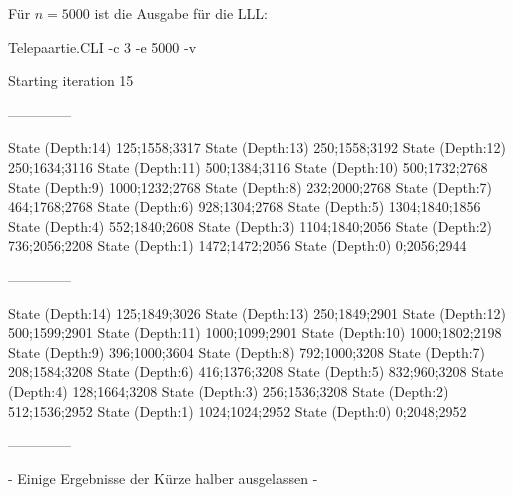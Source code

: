 \documentclass[a4paper,10pt,ngerman]{scrartcl}
\begin{document}
Für \(n = 5000\) ist die Ausgabe für die LLL:
\begin{lstcs}
Telepaartie.CLI -c 3 -e 5000 -v

Starting iteration 15

--------------

State (Depth:14) {125;1558;3317}
State (Depth:13) {250;1558;3192}
State (Depth:12) {250;1634;3116}
State (Depth:11) {500;1384;3116}
State (Depth:10) {500;1732;2768}
State (Depth:9) {1000;1232;2768}
State (Depth:8) {232;2000;2768}
State (Depth:7) {464;1768;2768}
State (Depth:6) {928;1304;2768}
State (Depth:5) {1304;1840;1856}
State (Depth:4) {552;1840;2608}
State (Depth:3) {1104;1840;2056}
State (Depth:2) {736;2056;2208}
State (Depth:1) {1472;1472;2056}
State (Depth:0) {0;2056;2944}

--------------

State (Depth:14) {125;1849;3026}
State (Depth:13) {250;1849;2901}
State (Depth:12) {500;1599;2901}
State (Depth:11) {1000;1099;2901}
State (Depth:10) {1000;1802;2198}
State (Depth:9) {396;1000;3604}
State (Depth:8) {792;1000;3208}
State (Depth:7) {208;1584;3208}
State (Depth:6) {416;1376;3208}
State (Depth:5) {832;960;3208}
State (Depth:4) {128;1664;3208}
State (Depth:3) {256;1536;3208}
State (Depth:2) {512;1536;2952}
State (Depth:1) {1024;1024;2952}
State (Depth:0) {0;2048;2952}

--------------
\end{lstcs}

- Einige Ergebnisse der Kürze halber ausgelassen -



\end{document}
